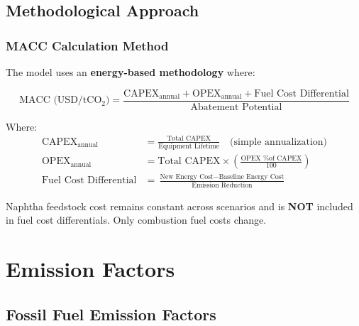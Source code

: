 \documentclass[11pt,a4paper]{report}
\newcommand{\tco}{tCO$_2$}
\begin{document}
\section{Methodological Approach}

\subsection{MACC Calculation Method}

The model uses an \textbf{energy-based methodology} where:

\begin{equation}
\text{MACC (USD/\tco)} = \frac{\text{CAPEX}_{\text{annual}} + \text{OPEX}_{\text{annual}} + \text{Fuel Cost Differential}}{\text{Abatement Potential}}
\end{equation}

Where:
\begin{align*}
\text{CAPEX}_{\text{annual}} &= \frac{\text{Total CAPEX}}{\text{Equipment Lifetime}} \quad \text{(simple annualization)} \\
\text{OPEX}_{\text{annual}} &= \text{Total CAPEX} \times \left(\frac{\text{OPEX \% of CAPEX}}{100}\right) \\
\text{Fuel Cost Differential} &= \frac{\text{New Energy Cost} - \text{Baseline Energy Cost}}{\text{Emission Reduction}}
\end{align*}

\vspace{0.5cm}

\begin{tcolorbox}[colback=lightgray,colframe=darkblue,title=Critical Principle]
Naphtha feedstock cost remains constant across scenarios and is \textbf{NOT} included in fuel cost differentials. Only combustion fuel costs change.
\end{tcolorbox}

\clearpage

\chapter{Emission Factors}

\section{Fossil Fuel Emission Factors}
\end{document}
